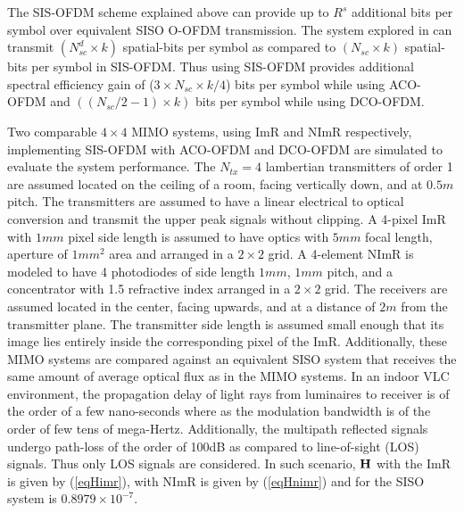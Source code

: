 \documentclass[12pt,letterpaper,onecolumn]{article} %
\newcommand{\vm}[1]{{\bf{#1}}}
\begin{document}
The SIS-OFDM scheme explained above can provide up to $R^s$ additional bits per symbol over equivalent SISO O-OFDM transmission. The system explored in \cite{zha12a} can transmit $(N_{sc}^d\times k)$ spatial-bits per symbol as compared to $(N_{sc}\times k)$ spatial-bits per symbol in SIS-OFDM. Thus using SIS-OFDM provides additional spectral efficiency gain of ($3\times N_{sc}\times k/4$) bits per symbol while using ACO-OFDM and $((N_{sc}/2 -1)\times k)$ bits per symbol while using DCO-OFDM.

Two comparable $4\times 4$ MIMO systems, using ImR and NImR respectively, implementing SIS-OFDM with ACO-OFDM and DCO-OFDM are simulated to evaluate the system performance. The $N_{tx}=4$ lambertian transmitters of order 1 are assumed located on the ceiling of a room, facing vertically down, and at $0.5m$ pitch. The transmitters are assumed to have a linear electrical to optical conversion and transmit the upper peak signals without clipping. A 4-pixel ImR with $1mm$ pixel side length is assumed to have optics with $5mm$ focal length, aperture of $1mm^2$ area and arranged in a $2\times 2$ grid. A 4-element NImR is modeled to have 4 photodiodes of side length $1mm$, $1mm$ pitch, and a concentrator with 1.5 refractive index arranged in a $2\times 2$ grid. The receivers are assumed located in the center, facing upwards, and at a distance of $2m$ from the transmitter plane. The transmitter side length is assumed small enough that its image lies entirely inside the corresponding pixel of the ImR. {\color{red}Additionally, these MIMO systems are compared against an equivalent SISO system that receives the same amount of average optical flux as in the MIMO systems.} In an indoor VLC environment, the propagation delay of light rays from luminaires to receiver is of the order of a few nano-seconds where as the modulation bandwidth is of the order of few tens of mega-Hertz. Additionally, the multipath reflected signals undergo path-loss of the order of 100dB as compared to line-of-sight (LOS) signals. Thus only LOS signals are considered. In such scenario, $\vm{H}$ with the ImR is given by (\ref{eqHimr}), with NImR is given by (\ref{eqHnimr}) {\color{red}and for the SISO system is $0.8979\times 10^{-7}$.}
\end{document}
